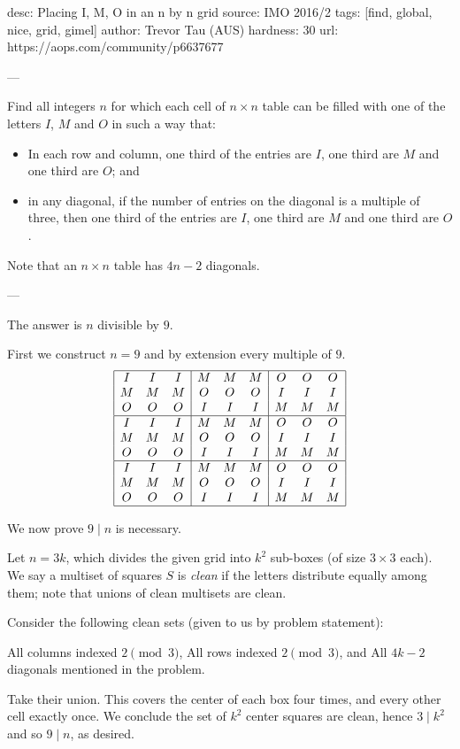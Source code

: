 desc:  Placing I, M, O in an n by n grid
source:  IMO 2016/2
tags:  [find, global, nice, grid, gimel]
author: Trevor Tau (AUS)
hardness: 30
url: https://aops.com/community/p6637677

---

Find all integers $n$ for which each cell of $n \times n$ table
can be filled with one of the letters $I$, $M$ and $O$ in such a way that:
\begin{itemize}
\item In each row and column,  one third of the entries are $I$,
one third are $M$ and one third are $O$; and
\item in any diagonal, if the number of entries on the diagonal is a multiple of three,
then one third of the entries are $I$, one third are $M$ and one third are $O$.
\end{itemize}
Note that an $n \times n$ table has $4n-2$ diagonals.

---

The answer is $n$ divisible by $9$.

First we construct $n=9$ and by extension every multiple of $9$.
\[
 \begin{array}{|ccc|ccc|ccc|} \hline
  I & I & I & M & M & M & O & O & O \\
  M & M & M & O & O & O & I & I & I \\
  O & O & O & I & I & I & M & M & M \\\hline
  I & I & I & M & M & M & O & O & O \\
  M & M & M & O & O & O & I & I & I \\
  O & O & O & I & I & I & M & M & M \\\hline
  I & I & I & M & M & M & O & O & O \\
  M & M & M & O & O & O & I & I & I \\
  O & O & O & I & I & I & M & M & M \\\hline
 \end{array}
\]

We now prove $9 \mid n$ is necessary.

Let $n = 3k$, which divides the given grid into $k^2$ sub-boxes
(of size $3 \times 3$ each).
We say a multiset of squares $S$ is \emph{clean} if
the letters distribute equally among them;
note that unions of clean multisets are clean.

Consider the following clean sets (given to us by problem statement):
\begin{itemize}
\ii All columns indexed $2 \pmod 3$,
\ii All rows indexed $2 \pmod 3$, and
\ii All $4k-2$ diagonals mentioned in the problem.
\end{itemize}
Take their union.
This covers the center of each box four times,
and every other cell exactly once.
We conclude the set of $k^2$ center squares
are clean, hence $3 \mid k^2$ and so $9 \mid n$,
as desired.

